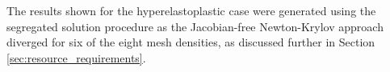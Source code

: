 \documentclass[sn-mathphys,Numbered]{sn-jnl}%
\begin{document}
The results shown for the hyperelastoplastic case were generated using the segregated solution procedure as the Jacobian-free Newton-Krylov approach diverged for six of the eight mesh densities, as discussed further in Section \ref{sec:resource_requirements}.

\end{document}

